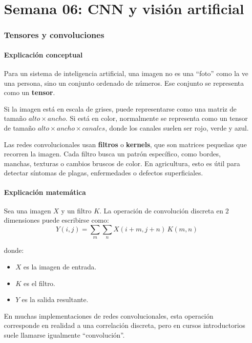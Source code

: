 \documentclass[12pt]{article}
\begin{document}
\part{Semana 06: CNN y visión artificial}

\section{Tensores y convoluciones}

\subsection{Explicación conceptual}
Para un sistema de inteligencia artificial, una imagen no es una ``foto'' como la ve una persona, sino un conjunto ordenado de números.
Ese conjunto se representa como un \textbf{tensor}.

Si la imagen está en escala de grises, puede representarse como una matriz de tamaño \(alto \times ancho\).
Si está en color, normalmente se representa como un tensor de tamaño \(alto \times ancho \times canales\), donde los canales suelen ser rojo, verde y azul.

Las redes convolucionales usan \textbf{filtros} o \textbf{kernels}, que son matrices pequeñas que recorren la imagen.
Cada filtro busca un patrón específico, como bordes, manchas, texturas o cambios bruscos de color.
En agricultura, esto es útil para detectar síntomas de plagas, enfermedades o defectos superficiales.

\subsection{Explicación matemática}
Sea una imagen \(X\) y un filtro \(K\).
La operación de convolución discreta en \(2\) dimensiones puede escribirse como:
\[
Y(i,j) = \sum_{m}\sum_{n} X(i+m,j+n)\,K(m,n)
\]

donde:
\begin{itemize}
    \item \(X\) es la imagen de entrada.
    \item \(K\) es el filtro.
    \item \(Y\) es la salida resultante.
\end{itemize}

En muchas implementaciones de redes convolucionales, esta operación corresponde en realidad a una correlación discreta, pero en cursos introductorios suele llamarse igualmente ``convolución''.
\end{document}
